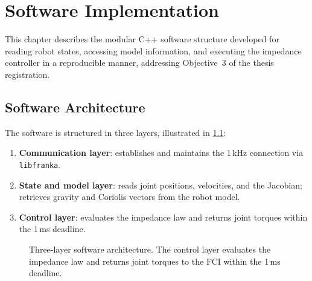 \chapter{Software Implementation}
\label{ch:implementation}

This chapter describes the modular C++ software structure developed for
reading robot states, accessing model information, and executing the
impedance controller in a reproducible manner, addressing Objective~3
of the thesis registration.

\section{Software Architecture}
\label{sec:sw_arch}

The software is structured in three layers, illustrated in
\cref{fig:sw_arch}:

\begin{enumerate}
  \item \textbf{Communication layer}: establishes and maintains the
        1\,kHz  connection via \texttt{libfranka}.
  \item \textbf{State and model layer}: reads joint positions, velocities,
        and the Jacobian; retrieves gravity and Coriolis vectors from the
        robot model.
  \item \textbf{Control layer}: evaluates the impedance law and returns
        joint torques within the 1\,ms deadline.
\end{enumerate}

\begin{figure}[htb]
\centering
{}
\caption{Three-layer software architecture. The control layer evaluates
         the impedance law and returns joint torques to the FCI
         within the 1\,ms deadline.}
\label{fig:sw_arch}
\end{figure}

